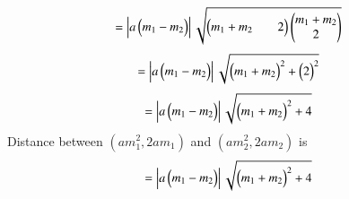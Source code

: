 \documentclass[journal,12pt,twocolumn]{IEEEtran}
\begin{document}
\begin{align}
&=\abs{a\myvec{m_1-m_2}}\sqrt{\myvec{m_1+m_2&&2}\myvec{m_1+m_2\\2}}
\end{align}
\begin{align}
&=\abs{a\myvec{m_1-m_2}}\sqrt{\myvec{m_1+m_2}^2+\myvec{2}^2}\label{eq2}
\end{align}
\begin{align}
&=\abs{a\myvec{m_1-m_2}}\sqrt{\myvec{m_1+m_2}^2+4}
\end{align}
Distance between $(am_1^2,2am_1)$ and $(am_2^2,2am_2)$ is
\begin{align}
&=\abs{a\myvec{m_1-m_2}}\sqrt{\myvec{m_1+m_2}^2+4}
\end{align}
\end{document}
